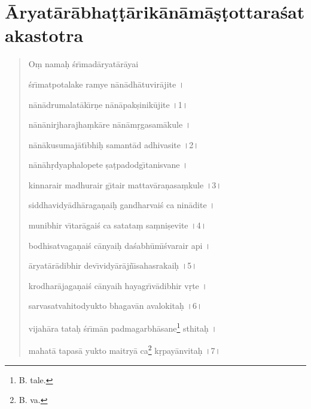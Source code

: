 \documentclass[a4paper, 11pt, oneside, french, landscape, twocolumn]{article}
\begin{document}
\section{\={A}ryat\={a}r\={a}bha\d{t}\d{t}\={a}rik\={a}n\={a}m\={a}\d{s}\d{t}ottara\'{s}atakastotra}
\begin{quotation}\scriptsize
O\d{m} nama\d{h} \'{s}r\={\i}mad\={a}ryat\={a}r\={a}yai

\bigskip

\'{s}r\={\i}matpotalake ramye n\={a}n\={a}dh\={a}tuvir\={a}jite \texthindi{।}

n\={a}n\={a}drumalat\={a}k\={\i}r\d{n}e n\={a}n\={a}pak\d{s}inik\={u}jite \texthindi{।}1\texthindi{।}

\bigskip

n\={a}n\={a}nirjharajha\d{m}k\={a}re n\={a}n\={a}m\d{r}gasam\={a}kule \texthindi{।}

n\={a}n\={a}kusumaj\={a}t\={\i}bhi\d{h} samant\={a}d adhivasite \texthindi{।}2\texthindi{।}

\bigskip

n\={a}n\={a}h\d{r}dyaphalopete \d{s}a\d{t}padodg\={\i}tanisvane \texthindi{।}

kinnarair madhurair g\={\i}tair mattav\={a}ra\d{n}asa\d{m}kule \texthindi{।}3\texthindi{।}

\bigskip

siddhavidy\={a}dh\={a}raga\d{n}ai\d{h} gandharvai\'{s} ca nin\={a}dite \texthindi{।}

munibhir v\={\i}tar\={a}gai\'{s} ca satata\d{m} sa\d{m}ni\d{s}evite \texthindi{।}4\texthindi{।}

\bigskip

bodhisatvaga\d{n}ai\'{s} c\={a}nyai\d{h} da\'{s}abh\={u}m\={\i}\'{s}varair api \texthindi{।}

\={a}ryat\={a}r\={a}dibhir dev\={\i}vidy\={a}r\={a}j\~{n}\={\i}sahasrakai\d{h} \texthindi{।}5\texthindi{।}

\bigskip

krodhar\={a}jaga\d{n}ai\'{s} c\={a}nyaih hayagr\={\i}v\={a}dibhir v\d{r}te \texthindi{।}

sarvasatvahitodyukto bhagav\={a}n avalokita\d{h} \texthindi{।}6\texthindi{।}

\bigskip

vijah\={a}ra tata\d{h} \'{s}r\={\i}m\={a}n padmagarbh\={a}sane\footnote{B. tale.} sthita\d{h} \texthindi{।}

mahat\={a} tapas\={a} yukto maitry\={a} ca\footnote{B. va.} k\d{r}pay\={a}nvita\d{h} \texthindi{।}7\texthindi{।}


\end{quotation}
\end{document}
